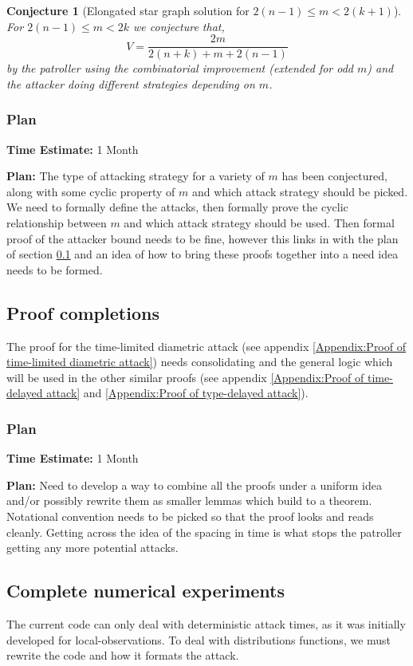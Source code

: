 \documentclass[a4paper,10pt]{article}
\newtheorem{conjecture}[theorem]{Conjecture}
\theoremstyle{definition}
\theoremstyle{definition}
\theoremstyle{remark}
\theoremstyle{definition}
\begin{document}
\begin{conjecture}[Elongated star graph solution for $2(n-1) \leq m < 2(k+1)$]
For $2(n-1) \leq m < 2k$ we conjecture that,
$$V=\frac{2m}{2(n+k)+m+2(n-1)}$$
by the patroller using the combinatorial improvement (extended for odd $m$) and the attacker doing different strategies depending on $m$.
\end{conjecture}

\subsubsection{Plan}
\textbf{Time Estimate:} 1 Month

\textbf{Plan:} The type of attacking strategy for a variety of $m$ has been conjectured, along with some cyclic property of $m$ and which attack strategy should be picked. We need to formally define the attacks, then formally prove the cyclic relationship between $m$ and which attack strategy should be used. Then formal proof of the attacker bound needs to be fine, however this links in with the plan of section \ref{Section:Proof completions} and an idea of how to bring these proofs together into a need idea needs to be formed.

\subsection{Proof completions}
\label{Section:Proof completions}
The proof for the time-limited diametric attack (see appendix \ref{Appendix:Proof of time-limited diametric attack}) needs consolidating and the general logic which will be used in the other similar proofs (see appendix \ref{Appendix:Proof of time-delayed attack} and \ref{Appendix:Proof of type-delayed attack}).

\subsubsection{Plan}
\textbf{Time Estimate:} 1 Month

\textbf{Plan:} Need to develop a way to combine all the proofs under a uniform idea and/or possibly rewrite them as smaller lemmas which build to a theorem. Notational convention needs to be picked so that the proof looks and reads cleanly. Getting across the idea of the spacing in time is what stops the patroller getting any more potential attacks.

\subsection{Complete numerical experiments}
\label{Section:Complete Numerical experiments for an instantaneously moving patroller}
The current code can only deal with deterministic attack times, as it was initially developed for local-observations. To deal with distributions functions, we must rewrite the code and how it formats the attack.
\end{document}
